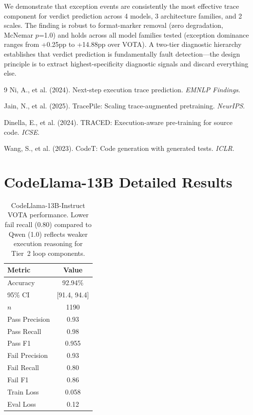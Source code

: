 \documentclass[11pt,a4paper]{article}
\begin{document}
We demonstrate that exception events are consistently the most effective trace component for verdict prediction across 4 models, 3 architecture families, and 2 scales. The finding is robust to format-marker removal (zero degradation, McNemar $p$=1.0) and holds across all model families tested (exception dominance ranges from +0.25pp to +14.88pp over VOTA). A two-tier diagnostic hierarchy establishes that verdict prediction is fundamentally fault detection---the design principle is to extract highest-specificity diagnostic signals and discard everything else.


\begin{thebibliography}{9}
Ni, A., et al. (2024). Next-step execution trace prediction. \emph{EMNLP Findings}.

Jain, N., et al. (2025). TracePile: Scaling trace-augmented pretraining. \emph{NeurIPS}.

Dinella, E., et al. (2024). TRACED: Execution-aware pre-training for source code. \emph{ICSE}.

Wang, S., et al. (2023). CodeT: Code generation with generated tests. \emph{ICLR}.
\end{thebibliography}

\appendix

\section{CodeLlama-13B Detailed Results}
\label{app:codellama}

\begin{table}[h]
\centering
\small
\begin{tabular}{lc}
\toprule
\textbf{Metric} & \textbf{Value} \\
\midrule
Accuracy & 92.94\% \\
95\% CI & [91.4, 94.4] \\
$n$ & 1190 \\
Pass Precision & 0.93 \\
Pass Recall & 0.98 \\
Pass F1 & 0.955 \\
Fail Precision & 0.93 \\
Fail Recall & 0.80 \\
Fail F1 & 0.86 \\
Train Loss & 0.058 \\
Eval Loss & 0.12 \\
\bottomrule
\end{tabular}
\caption{CodeLlama-13B-Instruct VOTA performance. Lower fail recall (0.80) compared to Qwen (1.0) reflects weaker execution reasoning for Tier~2 loop components.}
\label{tab:codellama_detail}
\end{table}
\end{document}
